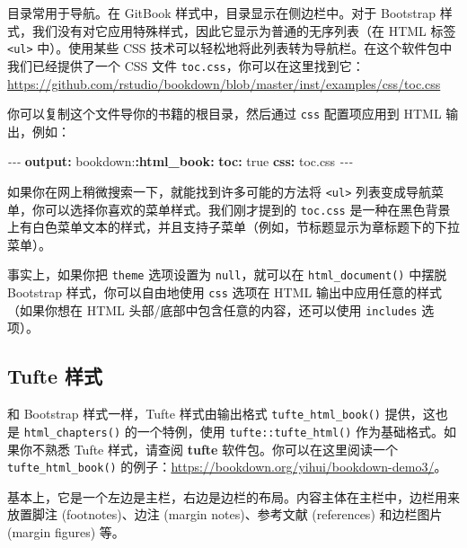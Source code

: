 \documentclass[
  12pt,
]{krantz}
\newenvironment{Shaded}{\begin{snugshade}}{\end{snugshade}}
\newcommand{\AttributeTok}[1]{\textcolor[rgb]{0.13,0.29,0.53}{#1}}
\newcommand{\CharTok}[1]{\textcolor[rgb]{0.31,0.60,0.02}{#1}}
\newcommand{\FunctionTok}[1]{\textcolor[rgb]{0.13,0.29,0.53}{\textbf{#1}}}
\newcommand{\KeywordTok}[1]{\textcolor[rgb]{0.13,0.29,0.53}{\textbf{#1}}}
\newcommand{\PreprocessorTok}[1]{\textcolor[rgb]{0.56,0.35,0.01}{\textit{#1}}}
\theoremstyle{definition}
\theoremstyle{definition}
\theoremstyle{definition}
\theoremstyle{definition}
\theoremstyle{remark}
\begin{document}
目录常用于导航。在 GitBook 样式中，目录显示在侧边栏中。对于 Bootstrap 样式，我们没有对它应用特殊样式，因此它显示为普通的无序列表（在 HTML 标签 \texttt{\textless{}ul\textgreater{}} 中）。使用某些 CSS 技术可以轻松地将此列表转为导航栏。在这个软件包中我们已经提供了一个 CSS 文件 \texttt{toc.css}，你可以在这里找到它：\url{https://github.com/rstudio/bookdown/blob/master/inst/examples/css/toc.css}

你可以复制这个文件导你的书籍的根目录，然后通过 \texttt{css} 配置项应用到 HTML 输出，例如：

\begin{Shaded}
\begin{Highlighting}[]
\PreprocessorTok{{-}{-}{-}}
\FunctionTok{output}\KeywordTok{:}
\AttributeTok{  bookdown:}\FunctionTok{:html\_book}\KeywordTok{:}
\AttributeTok{    }\FunctionTok{toc}\KeywordTok{:}\AttributeTok{ }\CharTok{true}
\AttributeTok{    }\FunctionTok{css}\KeywordTok{:}\AttributeTok{ toc.css}
\PreprocessorTok{{-}{-}{-}}
\end{Highlighting}
\end{Shaded}

如果你在网上稍微搜索一下，就能找到许多可能的方法将 \texttt{\textless{}ul\textgreater{}} 列表变成导航菜单，你可以选择你喜欢的菜单样式。我们刚才提到的 \texttt{toc.css} 是一种在黑色背景上有白色菜单文本的样式，并且支持子菜单（例如，节标题显示为章标题下的下拉菜单）。

事实上，如果你把 \texttt{theme} 选项设置为 \texttt{null}，就可以在 \texttt{html\_document()} 中摆脱 Bootstrap 样式，你可以自由地使用 \texttt{css} 选项在 HTML 输出中应用任意的样式（如果你想在 HTML 头部/底部中包含任意的内容，还可以使用 \texttt{includes} 选项）。

\subsection{Tufte 样式}\label{tufte-style}

和 Bootstrap 样式一样，Tufte 样式由输出格式 \texttt{tufte\_html\_book()} 提供，这也是 \texttt{html\_chapters()} 的一个特例，使用 \texttt{tufte::tufte\_html()} 作为基础格式。如果你不熟悉 Tufte 样式，请查阅 \textbf{tufte} 软件包\citep{R-tufte}。你可以在这里阅读一个 \texttt{tufte\_html\_book()} 的例子：\url{https://bookdown.org/yihui/bookdown-demo3/}。

基本上，它是一个左边是主栏，右边是边栏的布局。内容主体在主栏中，边栏用来放置脚注 (footnotes)、边注 (margin notes)、参考文献 (references) 和边栏图片 (margin figures) 等。
\end{document}
